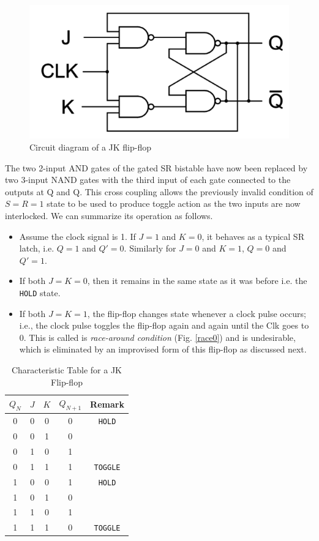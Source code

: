 \begin{figure}[H]
    \centering
    \includegraphics[width=0.70\columnwidth]{images/jk.png}
    \caption{Circuit diagram of a JK flip-flop}
    \label{4}
\end{figure}

The two 2-input AND gates of the gated SR bistable have now been replaced by two 3-input NAND gates with the third input of each gate connected to the outputs at Q and Q. This cross coupling allows the previously invalid condition of $S=R=1$ state to be used to produce toggle action as the two inputs are now interlocked. We can summarize its operation as follows.

\begin{itemize}
    \item Assume the clock signal is 1. If $J=1$ and $K=0$, it behaves as a typical SR latch, i.e. $Q=1$ and $Q'=0$. Similarly for $J=0$ and $K=1$, $Q=0$ and $Q'=1$.
    \item If both $J=K=0$, then it remains in the same state as it was before i.e. the \verb|HOLD| state.
    \item If both $J=K=1$, the flip-flop changes state whenever a clock
    pulse occurs; i.e., the clock pulse toggles the flip-flop again and again until the Clk goes to 0. This is called is \textit{race-around condition} (Fig. \ref{race0}) and is undesirable, which is eliminated by an improvised form of this flip-flop as discussed next.
\end{itemize}

\begin{table}[H]
    \centering
    \begin{tabular}{|c|c|c|c|c|}\hline
        $Q_N$ & $J$ & $K$ & $Q_{N+1}$ & Remark \\ \hline
        0 & 0 & 0 & 0 & \verb|HOLD| \\ 
        0 & 0 & 1 & 0 & \\ 
        0 & 1 & 0 & 1 &\\ 
        0 & 1 & 1 & 1 & \verb|TOGGLE| \\ 
        1 & 0 & 0 & 1 & \verb|HOLD|\\ 
        1 & 0 & 1 & 0 &\\ 
        1 & 1 & 0 & 1 &\\
        1 & 1 & 1 & 0 & \verb|TOGGLE| \\ \hline
    \end{tabular}
    \caption{Characteristic Table for a JK Flip-flop}
\end{table}

